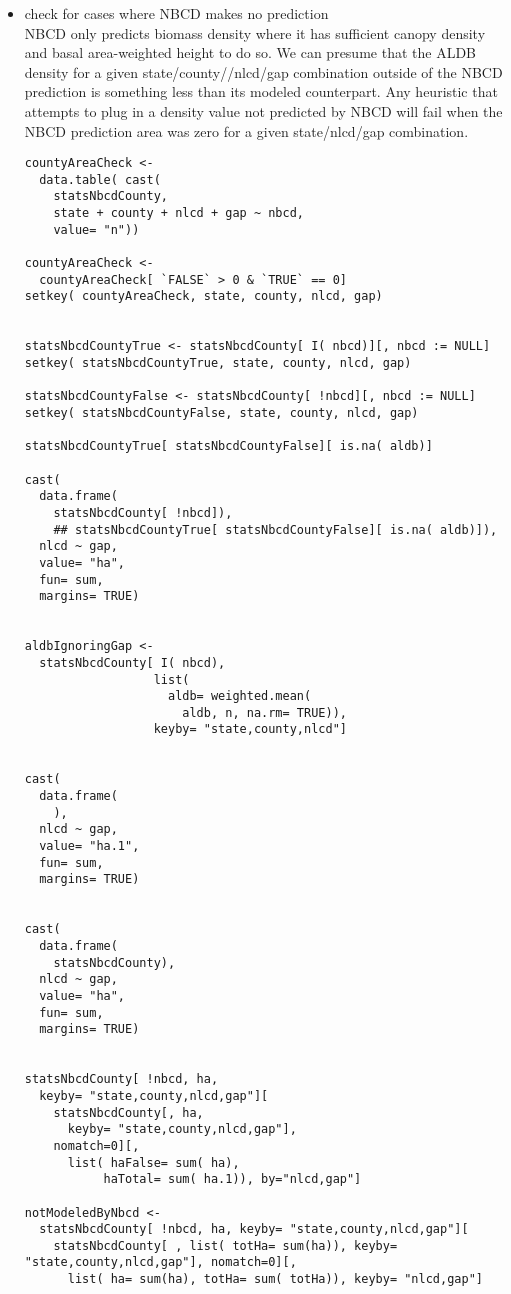 \documentclass[11pt]{article}
\begin{document}
\begin{itemize}

\item check for cases where NBCD makes no prediction\\
\label{sec-3-5-5-1}%
NBCD only predicts biomass density where it has sufficient canopy
density and basal area-weighted height to do so.  We can presume that
the ALDB density for a given state/county//nlcd/gap combination outside of the
NBCD prediction is something less than its modeled counterpart.  Any
heuristic that attempts to plug in a density value not predicted by
NBCD will fail when the NBCD prediction area was zero for a given
state/nlcd/gap combination.


\begin{verbatim}
countyAreaCheck <- 
  data.table( cast(
    statsNbcdCounty,
    state + county + nlcd + gap ~ nbcd,
    value= "n"))

countyAreaCheck <-
  countyAreaCheck[ `FALSE` > 0 & `TRUE` == 0]
setkey( countyAreaCheck, state, county, nlcd, gap)


statsNbcdCountyTrue <- statsNbcdCounty[ I( nbcd)][, nbcd := NULL]
setkey( statsNbcdCountyTrue, state, county, nlcd, gap)

statsNbcdCountyFalse <- statsNbcdCounty[ !nbcd][, nbcd := NULL]
setkey( statsNbcdCountyFalse, state, county, nlcd, gap)

statsNbcdCountyTrue[ statsNbcdCountyFalse][ is.na( aldb)]

cast(
  data.frame(
    statsNbcdCounty[ !nbcd]),
    ## statsNbcdCountyTrue[ statsNbcdCountyFalse][ is.na( aldb)]),
  nlcd ~ gap,
  value= "ha",
  fun= sum,
  margins= TRUE)


aldbIgnoringGap <-
  statsNbcdCounty[ I( nbcd),
                  list(
                    aldb= weighted.mean(
                      aldb, n, na.rm= TRUE)),
                  keyby= "state,county,nlcd"]


cast(
  data.frame(
    ),
  nlcd ~ gap,
  value= "ha.1",
  fun= sum,
  margins= TRUE)


cast(
  data.frame(
    statsNbcdCounty),
  nlcd ~ gap,
  value= "ha",
  fun= sum,
  margins= TRUE)


statsNbcdCounty[ !nbcd, ha,
  keyby= "state,county,nlcd,gap"][
    statsNbcdCounty[, ha,
      keyby= "state,county,nlcd,gap"],
    nomatch=0][,
      list( haFalse= sum( ha),
           haTotal= sum( ha.1)), by="nlcd,gap"]

notModeledByNbcd <- 
  statsNbcdCounty[ !nbcd, ha, keyby= "state,county,nlcd,gap"][
    statsNbcdCounty[ , list( totHa= sum(ha)), keyby= "state,county,nlcd,gap"], nomatch=0][,
      list( ha= sum(ha), totHa= sum( totHa)), keyby= "nlcd,gap"]



\end{verbatim}
\end{itemize}
\end{document}
